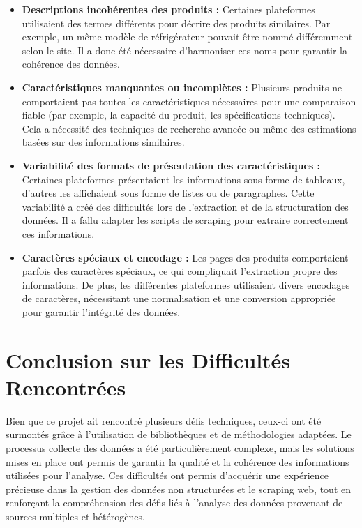 \documentclass[a4paper, 12pt, oneside]{report}
\begin{document}
\begin{itemize}
    \item \textbf{Descriptions incohérentes des produits :} Certaines plateformes utilisaient des termes différents pour décrire des produits similaires. Par exemple, un même modèle de réfrigérateur pouvait être nommé différemment selon le site. Il a donc été nécessaire d’harmoniser ces noms pour garantir la cohérence des données.
    \item \textbf{Caractéristiques manquantes ou incomplètes :} Plusieurs produits ne comportaient pas toutes les caractéristiques nécessaires pour une comparaison fiable (par exemple, la capacité du produit, les spécifications techniques). Cela a nécessité des techniques de recherche avancée ou même des estimations basées sur des informations similaires.
    \item \textbf{Variabilité des formats de présentation des caractéristiques :} Certaines plateformes présentaient les informations sous forme de tableaux, d’autres les affichaient sous forme de listes ou de paragraphes. Cette variabilité a créé des difficultés lors de l'extraction et de la structuration des données. Il a fallu adapter les scripts de scraping pour extraire correctement ces informations.
    \item \textbf{Caractères spéciaux et encodage :} Les pages des produits comportaient parfois des caractères spéciaux, ce qui compliquait l'extraction propre des informations. De plus, les différentes plateformes utilisaient divers encodages de caractères, nécessitant une normalisation et une conversion appropriée pour garantir l'intégrité des données.
\end{itemize}

\section{Conclusion sur les Difficultés Rencontrées}

Bien que ce projet ait rencontré plusieurs défis techniques, ceux-ci ont été surmontés grâce à l'utilisation de bibliothèques et de méthodologies adaptées. Le processus collecte des données a été particulièrement complexe, mais les solutions mises en place ont permis de garantir la qualité et la cohérence des informations utilisées pour l'analyse. Ces difficultés ont permis d'acquérir une expérience précieuse dans la gestion des données non structurées et le scraping web, tout en renforçant la compréhension des défis liés à l'analyse des données provenant de sources multiples et hétérogènes.
\end{document}
